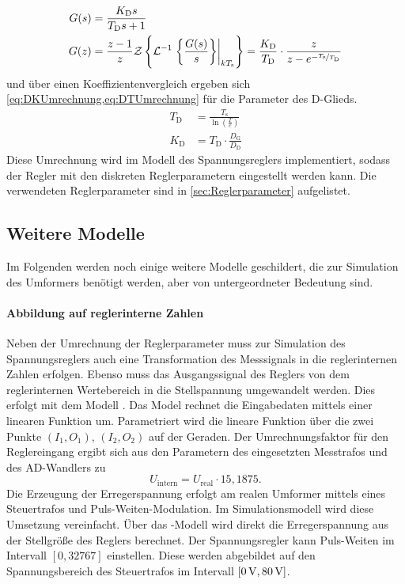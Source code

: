 \begin{align}
	G(s) &= \frac{K_\mathrm{D}s}{T_\mathrm{D}s+1}\label{eq:SD}\\
	G(z) &= \frac{z-1}{z} \mathcal{Z}\left\{ \mathcal{L}^{-1}\left.\left\{\frac{G(s)}{s}\right\}\right|_{kT_{\mathrm{s}}} \right\} = \frac{K_\mathrm{D}}{T_\mathrm{D}}\cdot\frac{z}{z-e^{-\nicefrac{T_\mathrm{s}}{T_\mathrm{D}}}}\label{eq:ZD}
\end{align}
und über einen Koeffizientenvergleich ergeben sich \cref{eq:DKUmrechnung,eq:DTUmrechnung} für die Parameter des D-Glieds.
\begin{align}
	T_\mathrm{D} &= \frac{T_\mathrm{s}}{\ln(\frac{T}{c})}\label{eq:DTUmrechnung}\\
	K_\mathrm{D} &= T_\mathrm{D}\cdot\frac{D_\mathrm{G}}{D_\mathrm{D}}\label{eq:DKUmrechnung}
\end{align}
Diese Umrechnung wird im Modell des Spannungsreglers implementiert, sodass der Regler mit den diskreten Reglerparametern eingestellt werden kann. Die verwendeten Reglerparameter sind in \cref{sec:Reglerparameter} aufgelistet.

\subsection{Weitere Modelle}\label{sec:WeitereModelle}
Im Folgenden werden noch einige weitere Modelle geschildert, die zur Simulation des Umformers benötigt werden, aber von untergeordneter Bedeutung sind.

\paragraph{Abbildung auf reglerinterne Zahlen}
\label{sec:AbbildungReglerZahlen}
Neben der Umrechnung der Reglerparameter muss zur Simulation des Spannungsreglers auch eine Transformation des Messsignals in die reglerinternen Zahlen erfolgen. Ebenso muss das Ausgangssignal des Reglers von dem reglerinternen Wertebereich in die Stellspannung umgewandelt werden. Dies erfolgt mit dem Modell . Das Model rechnet die Eingabedaten mittels einer linearen Funktion um. Parametriert wird die lineare Funktion über die zwei Punkte $(I_1,O_1),\,(I_2,O_2)$ auf der Geraden. Der Umrechnungsfaktor für den Reglereingang ergibt sich aus den Parametern des eingesetzten Messtrafos und des AD-Wandlers zu
\begin{equation}
	U_\mathrm{intern} = U_\mathrm{real}\cdot 15{,}1875.
\end{equation}
Die Erzeugung der Erregerspannung erfolgt am realen Umformer mittels eines Steuertrafos und Puls-Weiten-Modulation. Im Simulationsmodell wird diese Umsetzung vereinfacht. Über das -Modell wird direkt die Erregerspannung aus der Stellgröße des Reglers berechnet. Der Spannungsregler kann Puls-Weiten im Intervall $[0,32767]$ einstellen. Diese werden abgebildet auf den Spannungsbereich des Steuertrafos im Intervall $[\unit[0]{V},\unit[80]{V}]$. %

